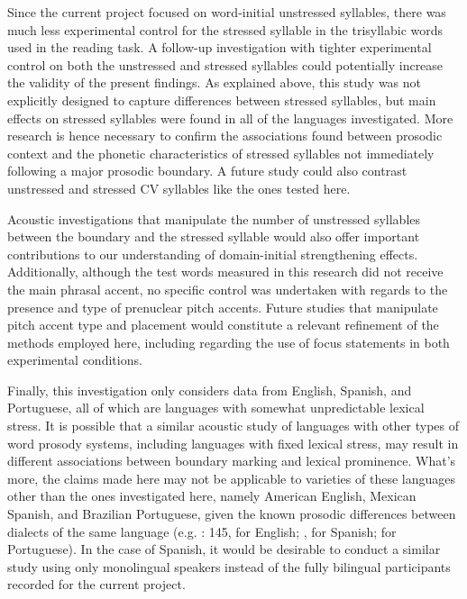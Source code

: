 \documentclass[output=paper]{langscibook}
\begin{document}
Since the current project focused on word-initial unstressed syllables, there was much less experimental control for the stressed syllable in the trisyllabic words used in the reading task. A follow-up investigation with tighter experimental control on both the unstressed and stressed syllables could potentially increase the validity of the present findings. As explained above, this study was not explicitly designed to capture differences between stressed syllables, but main effects on stressed syllables were found in all of the languages investigated. More research is hence necessary to confirm the associations found between prosodic context and the phonetic characteristics of stressed syllables not immediately following a major prosodic boundary. A future study could also contrast unstressed and stressed CV syllables like the ones tested here. 

Acoustic investigations that manipulate the number of unstressed syllables between the boundary and the stressed syllable would also offer important contributions to our understanding of domain-initial strengthening effects. Additionally, although the test words measured in this research did not receive the main phrasal accent, no specific control was undertaken with regards to the presence and type of prenuclear pitch accents. Future studies that manipulate pitch accent type and placement would constitute a relevant refinement of the methods employed here, including regarding the use of focus statements in both experimental conditions. 

Finally, this investigation only considers data from English, Spanish, and Portuguese, all of which are languages with somewhat unpredictable lexical stress. It is possible that a similar acoustic study of languages with other types of word prosody systems, including languages with fixed lexical stress, may result in different associations between boundary marking and lexical prominence. What’s more, the claims made here may not be applicable to varieties of these languages other than the ones investigated here, namely American English, Mexican Spanish, and Brazilian Portuguese, given the known prosodic differences between dialects of the same language (e.g. \citealt{cs11}: 145, for English; \citealt{pr10}, for Spanish; \citealt{fcfcfsov15} for Portuguese). In the case of Spanish, it would be desirable to conduct a similar study using only monolingual speakers instead of the fully bilingual participants recorded for the current project.
\end{document}
